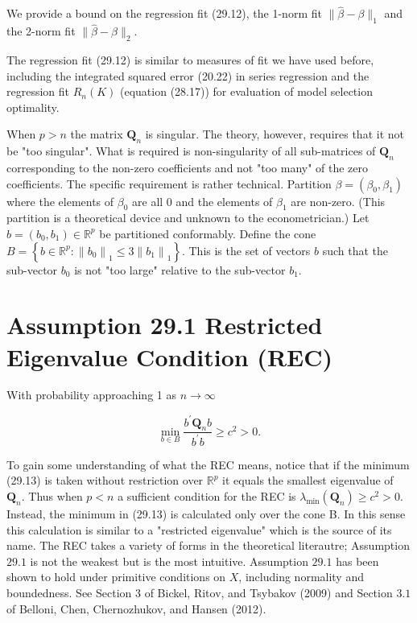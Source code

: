 \documentclass[10pt]{article}
\begin{document}
We provide a bound on the regression fit (29.12), the 1-norm fit $\|\widehat{\beta}-\beta\|_{1}$ and the 2-norm fit $\|\widehat{\beta}-\beta\|_{2}$.

The regression fit (29.12) is similar to measures of fit we have used before, including the integrated squared error (20.22) in series regression and the regression fit $R_{n}(K)$ (equation (28.17)) for evaluation of model selection optimality.

When $p>n$ the matrix $\boldsymbol{Q}_{n}$ is singular. The theory, however, requires that it not be "too singular". What is required is non-singularity of all sub-matrices of $\boldsymbol{Q}_{n}$ corresponding to the non-zero coefficients and not "too many" of the zero coefficients. The specific requirement is rather technical. Partition $\beta=\left(\beta_{0}, \beta_{1}\right)$ where the elements of $\beta_{0}$ are all 0 and the elements of $\beta_{1}$ are non-zero. (This partition is a theoretical device and unknown to the econometrician.) Let $b=\left(b_{0}, b_{1}\right) \in \mathbb{R}^{p}$ be partitioned conformably. Define the cone $B=\left\{b \in \mathbb{R}^{p}:\left\|b_{0}\right\|_{1} \leq 3\left\|b_{1}\right\|_{1}\right\}$. This is the set of vectors $b$ such that the sub-vector $b_{0}$ is not "too large" relative to the sub-vector $b_{1}$.

\section{Assumption 29.1 Restricted Eigenvalue Condition (REC)}
With probability approaching 1 as $n \rightarrow \infty$

$$
\min _{b \in B} \frac{b^{\prime} \boldsymbol{Q}_{n} b}{b^{\prime} b} \geq c^{2}>0 .
$$

To gain some understanding of what the REC means, notice that if the minimum (29.13) is taken without restriction over $\mathbb{R}^{p}$ it equals the smallest eigenvalue of $\boldsymbol{Q}_{n}$. Thus when $p<n$ a sufficient condition for the REC is $\lambda_{\min }\left(\boldsymbol{Q}_{n}\right) \geq c^{2}>0$. Instead, the minimum in (29.13) is calculated only over the cone B. In this sense this calculation is similar to a "restricted eigenvalue" which is the source of its name. The REC takes a variety of forms in the theoretical literautre; Assumption $29.1$ is not the weakest but is the most intuitive. Assumption $29.1$ has been shown to hold under primitive conditions on $X$, including normality and boundedness. See Section 3 of Bickel, Ritov, and Tsybakov (2009) and Section $3.1$ of Belloni, Chen, Chernozhukov, and Hansen (2012).
\end{document}
